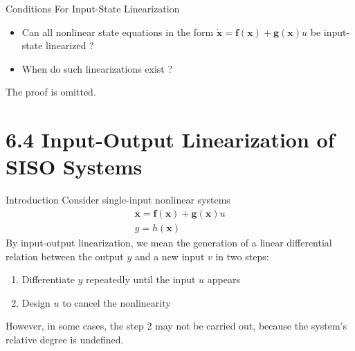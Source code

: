 \documentclass{beamer}
\renewcommand{\vec}[1]{\ensuremath{\boldsymbol{#1}}} %
\begin{document}
\begin{frame}{Conditions For Input-State Linearization}
    \begin{itemize}
      \item Can all nonlinear state equations in the form $ \dot{\vec{x}}=\vec{f}(\vec{x}) + \vec{g}(\vec{x})u $ be input-state linearized ?
      \item When do such linearizations exist ?
    \end{itemize}

    The proof is omitted.
\end{frame}


\section{6.4  Input-Output Linearization of SISO Systems}

\begin{frame}{Introduction}
    Consider single-input nonlinear systems
        \begin{equation}\label{nonlinear-system}
        \begin{array}{l}{\dot{\vec{x}}=\vec{f}(\vec{x})+\vec{g}(\vec{x}) u} \\ {y=h(\vec{x})}\end{array}
        \end{equation}
    By input-output linearization, we mean the generation of a linear differential relation between the output $y$ and a new input $v$ in two steps:
    \begin{enumerate}
      \item Differentiate $y$ repeatedly until the input $u$ appears
      \item Design $u$ to cancel the nonlinearity
    \end{enumerate}
    However, in some cases, the step 2 may not be carried out, because the system's {\color{red}relative degree is undefined}.
\end{frame}
\end{document}
